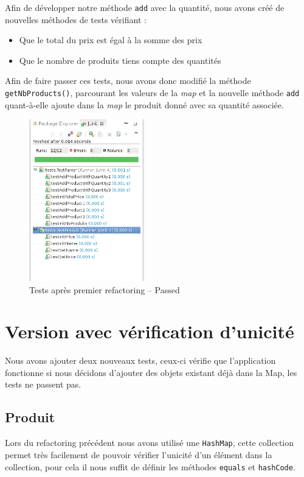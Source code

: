 \documentclass[a4paper, 11pt]{article}
\begin{document}
	Afin de développer notre méthode \texttt{add} avec la quantité, nous avons créé de nouvelles méthodes de tests vérifiant : 
	\begin{itemize}
		\item Que le total du prix est égal à la somme des prix 
		\item Que le nombre de produits tiens compte des quantités
	\end{itemize}

	Afin de faire passer ces tests, nous avons donc modifié la méthode \texttt{getNbProducts()}, parcourant les valeurs de la \textit{map} et la nouvelle méthode 
	\texttt{add} quant-à-elle ajoute dans la \textit{map} le produit donné avec sa quantité associée.

	\begin{figure}[H]
		\centering
		\includegraphics[width=5cm]{screen2.png}
		\caption{Tests après premier refactoring -- Passed}
	\end{figure}

	\section{Version avec vérification d'unicité}
	Nous avons ajouter deux nouveaux tests, ceux-ci vérifie que l'application fonctionne si nous décidons d'ajouter des objets existant déjà dans la Map, les
	tests ne passent pas.
	
	\subsection{Produit}
	Lors du refactoring précédent nous avons utilisé une \texttt{HashMap}, cette collection permet très facilement de pouvoir vérifier l'unicité d'un élément dans la
	collection, pour cela il nous suffit de définir les méthodes \texttt{equals} et \texttt{hashCode}.
\end{document}
